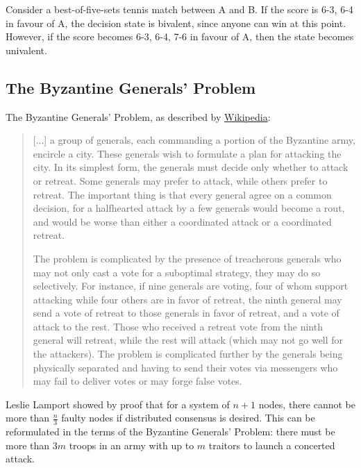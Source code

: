 Consider a best-of-five-sets tennis match between A and B. If the score is 6-3, 6-4 in favour of A, the decision state is bivalent, since anyone can win at this point. However, if the score becomes 6-3, 6-4, 7-6 in favour of A, then the state becomes univalent. 

\subsection{The Byzantine Generals' Problem}
The Byzantine Generals' Problem, as described by \href{https://en.wikipedia.org/wiki/Byzantine_fault_tolerance\#Byzantine_Generals\%27_Problem}{Wikipedia}:
\begin{quotation}
[...] a group of generals, each commanding a portion of the Byzantine army, encircle a city. These generals wish to formulate a plan for attacking the city. In its simplest form, the generals must decide only whether to attack or retreat. Some generals may prefer to attack, while others prefer to retreat. The important thing is that every general agree on a common decision, for a halfhearted attack by a few generals would become a rout, and would be worse than either a coordinated attack or a coordinated retreat.


The problem is complicated by the presence of treacherous generals who may not only cast a vote for a suboptimal strategy, they may do so selectively. For instance, if nine generals are voting, four of whom support attacking while four others are in favor of retreat, the ninth general may send a vote of retreat to those generals in favor of retreat, and a vote of attack to the rest. Those who received a retreat vote from the ninth general will retreat, while the rest will attack (which may not go well for the attackers). The problem is complicated further by the generals being physically separated and having to send their votes via messengers who may fail to deliver votes or may forge false votes. 
\end{quotation}

Leslie Lamport showed by proof that for a system of $n + 1$ nodes, there cannot be more than $\frac{n}{3}$ faulty nodes if distributed consensus is desired. This can be reformulated in the terms of the Byzantine Generals' Problem: there must be more than $3m$ troops in an army with up to $m$ traitors to launch a concerted attack.
